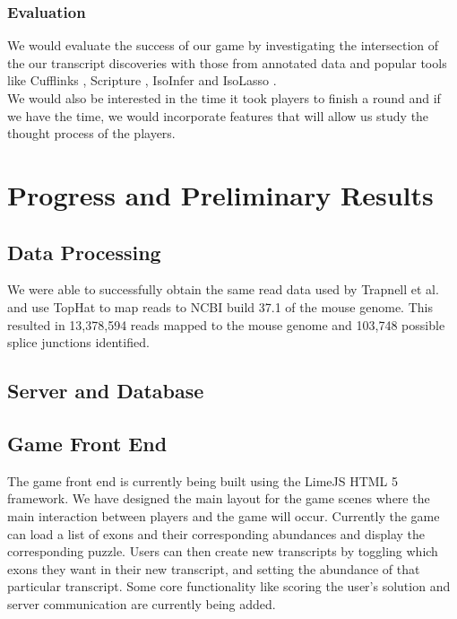 \documentclass[12pt]{article}
\begin{document}
\subsubsection*{Evaluation}
We would evaluate the success of our game by investigating the intersection of the our transcript discoveries with those from annotated data and popular tools like Cufflinks \citep{trapnell2010transcript}, Scripture \citep{guttman2010ab} , IsoInfer \citep{feng2010inference} and IsoLasso \citep{li2011isolasso}. \\
We would also be interested in the time it took players to finish a round and if we have the time, we would incorporate features that will allow us study the thought process of the players.

\section*{Progress and Preliminary Results}

\subsection*{Data Processing}
We were able to successfully obtain the same read data used by Trapnell et al. \citep{trapnell2010transcript} and use TopHat to map reads to NCBI build 37.1 of the mouse genome.
This resulted in 13,378,594 reads mapped to the mouse genome and 103,748 possible splice junctions identified.


\subsection*{Server and Database}

\subsection*{Game Front End}
The game front end is currently being built using the LimeJS HTML 5 framework. We have designed the main layout for the game scenes where the main interaction between players
and the game will occur. Currently the game can load a list of exons and their corresponding abundances and display the corresponding puzzle. Users can then create new transcripts 
by toggling which exons they want in their new transcript, and setting the abundance of that particular transcript. Some core functionality like scoring the user's solution and 
server communication are currently being added.
\end{document}
